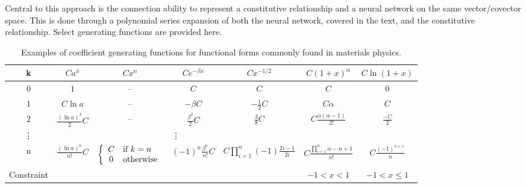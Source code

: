 Central to this approach is the connection ability to represent a constitutive relationship and a neural network on the same vector/covector space. This is done through a polynomial series expansion of both the neural network, covered in the text, and the constitutive relationship. Select generating functions are provided here.

\begin{sidewaystable}[htp]
\caption{Examples of coefficient generating functions for functional forms commonly found in materials physics.}
\begin{center}
\begin{tabular}{c | c c c c c c}
	k	& %
		$C a^x$	& %
			$C x^n$	& %
				$Ce^{-\beta x}$	& %
					$C x^{-1/2}$ & %
                        $C (1 + x)^\alpha$ & %
                            $C \ln(1 + x)$ \\[2ex]
	\hline
	0	& %
		$1$	& %
			--	& %
				$C$	& %
					$C$ & %
                        $C$ & %
                            $0$ \\[2ex]
	1	& %
		$C \ln a$	& %
			--	& %
				$-\beta C$		& %
					$-\frac{1}{2}C$ & %
                        $C\alpha$ & %
                            $C$ \\[2ex]
	2	& %
		$\frac{(\ln a)^2}{2} C$	& %
			--	&  %
				$\frac{\beta^2}{2} C$	& %
					$\frac{3}{8}C$	& %
                        $C\frac{\alpha (\alpha - 1)}{2!}$ & %
                            $\frac{-C}{2}$ \\[2ex]
	\vdots & \multicolumn{4}{c}{\vdots} \\[2ex]
	n	& %
		$\frac{(\ln a)^n}{n!} C$	& %
			$\left\{\begin{array}{c l}
				C & \text{if}\ k = n \\
				0 & \text{otherwise}
			  \end{array}\right.$	& %
				$(-1)^n\frac{\beta^n}{n!} C$	& %
					$C \prod_{i=1}^n (-1)\frac{2i - 1}{2i}$ & %
                        $C \frac{\prod_{i=1}^n \alpha - n + 1}{n!}$ & %
                            $C\frac{(-1)^{n+1}}{n}$ \\[2ex]
	\hline
    Constraint & %
        & %
            & %
                & %
                    & %
                        $-1 < x < 1$ & %
                            $-1 < x \le 1$ \\
    \hline
\end{tabular}
\end{center}
\label{tab:generating functions of common functions}
\end{sidewaystable}

